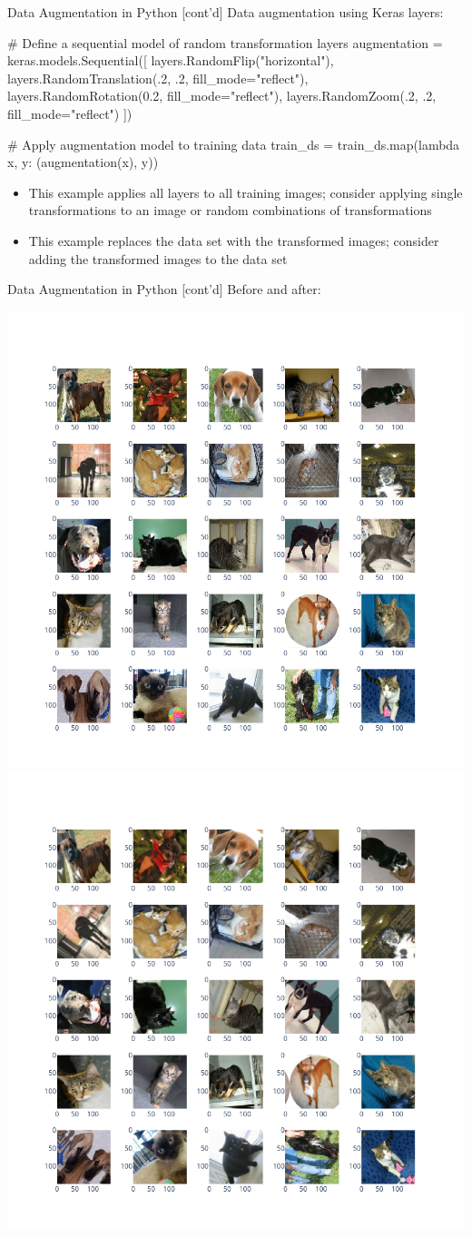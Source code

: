 \documentclass[ignorenonframetext,xcolor=x11names]{beamer}
\begin{document}
\begin{frame}[fragile]{Data Augmentation in Python \small [cont'd]}
Data augmentation using Keras layers:
\begin{pythoncode}
# Define a sequential model of random transformation layers
augmentation = keras.models.Sequential([
    layers.RandomFlip("horizontal"),
    layers.RandomTranslation(.2, .2, fill_mode="reflect"),
    layers.RandomRotation(0.2, fill_mode="reflect"),
    layers.RandomZoom(.2, .2, fill_mode="reflect")
])

# Apply augmentation model to training data
train_ds = train_ds.map(lambda x, y: (augmentation(x), y))
\end{pythoncode}

\begin{block}{}
\small
\begin{itemize}
   \item This example applies all layers to all training images; consider applying single transformations to an image or random combinations of transformations
   \item This example replaces the data set with the transformed images; consider adding the transformed images to the data set
\end{itemize}
\end{block}
\end{frame}

\begin{frame}{Data Augmentation in Python \small [cont'd]}
Before and after:

\includegraphics[width=.49\textwidth]{catsdogs_sample.png}
\includegraphics[width=.49\textwidth]{catsdogs_sample_transformed.png}
\end{frame}
\end{document}
